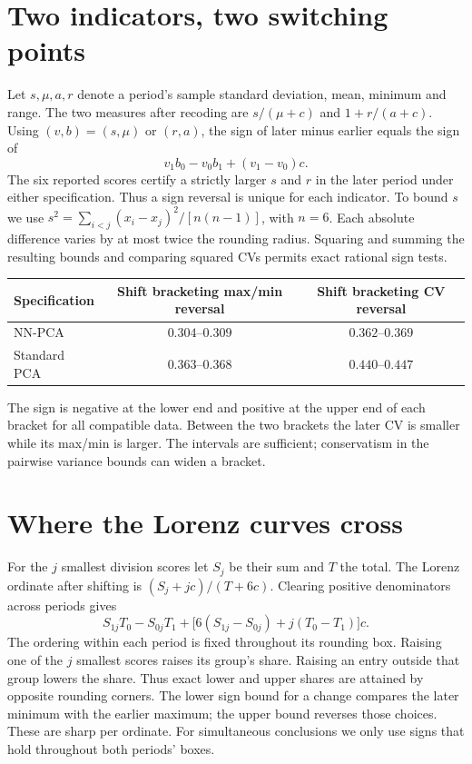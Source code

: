\documentclass[10pt]{article}
\begin{document}
\section{Two indicators, two switching points}
Let $s,\mu,a,r$ denote a period's sample standard deviation, mean, minimum and range. The two measures after recoding are $s/(\mu+c)$ and $1+r/(a+c)$. Using $(v,b)=(s,\mu)$ or $(r,a)$, the sign of later minus earlier equals the sign of
\[
               v_1b_0-v_0b_1+(v_1-v_0)c .
\]
The six reported scores certify a strictly larger $s$ and $r$ in the later period under either specification. Thus a sign reversal is unique for each indicator. To bound $s$ we use $s^2=\sum_{i<j}(x_i-x_j)^2/[n(n-1)]$, with $n=6$. Each absolute difference varies by at most twice the rounding radius. Squaring and summing the resulting bounds and comparing squared CVs permits exact rational sign tests.


\begin{center}
\begin{tabular}{lcc}\toprule
Specification & Shift bracketing max/min reversal & Shift bracketing CV reversal\\\midrule
NN-PCA & $0.304$--$0.309$ & $0.362$--$0.369$\\
Standard PCA & $0.363$--$0.368$ & $0.440$--$0.447$\\\bottomrule
\end{tabular}
\end{center}
The sign is negative at the lower end and positive at the upper end of each bracket for all compatible data. Between the two brackets the later CV is smaller while its max/min is larger. The intervals are sufficient; conservatism in the pairwise variance bounds can widen a bracket.

\newpage\section{Where the Lorenz curves cross}
For the $j$ smallest division scores let $S_j$ be their sum and $T$ the total. The Lorenz ordinate after shifting is $(S_j+jc)/(T+6c)$. Clearing positive denominators across periods gives
\[
 S_{1j}T_0-S_{0j}T_1+
 \bigl[6(S_{1j}-S_{0j})+j(T_0-T_1)\bigr]c .
\]
The ordering within each period is fixed throughout its rounding box. Raising one of the $j$ smallest scores raises its group's share. Raising an entry outside that group lowers the share. Thus exact lower and upper shares are attained by opposite rounding corners. The lower sign bound for a change compares the later minimum with the earlier maximum; the upper bound reverses those choices. These are sharp per ordinate. For simultaneous conclusions we only use signs that hold throughout both periods' boxes.
\end{document}
